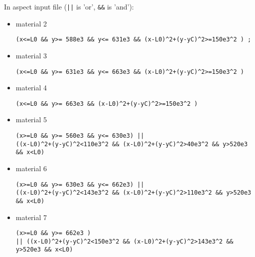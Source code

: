 In aspect input file ({\tt ||} is 'or', {\tt \&\&}  is 'and'):
\begin{itemize}
\item material 2
\begin{verbatim}
(x<=L0 && y>= 588e3 && y<= 631e3 && (x-L0)^2+(y-yC)^2>=150e3^2 ) ; 
\end{verbatim}
\item material 3
\begin{verbatim}
(x<=L0 && y>= 631e3 && y<= 663e3 && (x-L0)^2+(y-yC)^2>=150e3^2 ) 
\end{verbatim}
\item material 4
\begin{verbatim}
(x<=L0 && y>= 663e3 && (x-L0)^2+(y-yC)^2>=150e3^2 )
\end{verbatim}
\item material 5
\begin{verbatim}
(x>=L0 && y>= 560e3 && y<= 630e3) || 
((x-L0)^2+(y-yC)^2<110e3^2 && (x-L0)^2+(y-yC)^2>40e3^2 && y>520e3 && x<L0) 
\end{verbatim}
\item material 6
\begin{verbatim}
(x>=L0 && y>= 630e3 && y<= 662e3) || 
((x-L0)^2+(y-yC)^2<143e3^2 && (x-L0)^2+(y-yC)^2>110e3^2 && y>520e3 && x<L0) 
\end{verbatim}
\item material 7
\begin{verbatim}
(x>=L0 && y>= 662e3 )  
|| ((x-L0)^2+(y-yC)^2<150e3^2 && (x-L0)^2+(y-yC)^2>143e3^2 && y>520e3 && x<L0) 
\end{verbatim}
\end{itemize}






